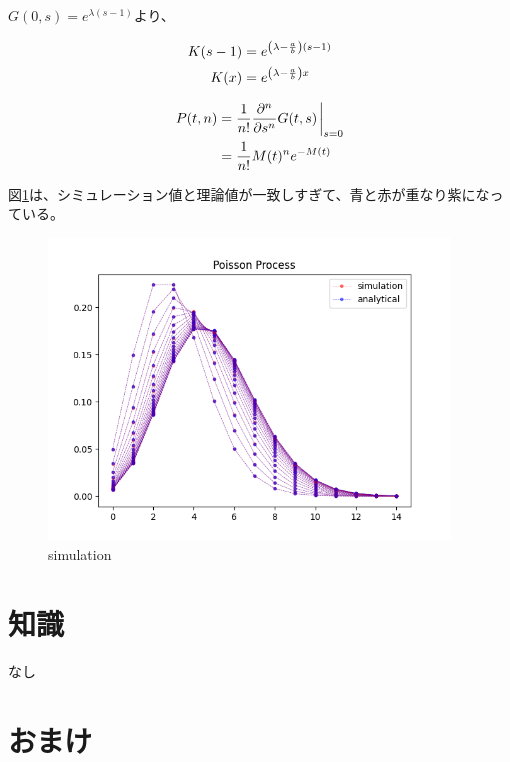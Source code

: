 \documentclass[a4paper, 10pt, dvipdfmx]{jlreq}
\begin{document}
$G(0,s)=e^{\lambda (s-1)}$より、

\begin{align*}
  K(s-1) & =e^{\qty(\lambda-\frac{a}{b})(s-1)} \\
  K(x)   & =e^{\qty(\lambda-\frac{a}{b})x}
\end{align*}

\begin{align*}
  P(t,n) & =\frac{1}{n!}\pdv{^n}{s^n}G(t,s)\eval_{s=0} \\
         & =\frac{1}{n!}M(t)^n e^{-M(t)}
\end{align*}

図\ref{img:simulation}は、シミュレーション値と理論値が一致しすぎて、青と赤が重なり紫になっている。

\begin{figure}[htbp]
  \begin{center}
    \includegraphics[height=80mm]{3.png}
    \caption{simulation}
    \label{img:simulation}
  \end{center}
\end{figure}

\section{知識}

なし

\section{おまけ}


\end{document}
